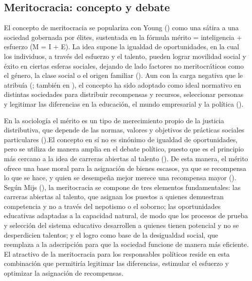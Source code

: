 \documentclass[
  spanish,
  a4paper,
  oneside]{scrbook}
\begin{document}
\subsection{Meritocracia: concepto y
debate}\label{meritocracia-concepto-y-debate}

El concepto de meritocracia se populariza con Young
() como una sátira a una sociedad
gobernada por élites, sustentada en la fórmula mérito = inteligencia +
esfuerzo (M = I + E). La idea supone la igualdad de oportunidades, en la
cual los individuos, a través del esfuerzo y el talento, pueden lograr
movilidad social y éxito en ciertas esferas sociales, dejando de lado
factores no meritocráticos como el género, la clase social o el origen
familiar ().
Aun con la carga negativa que le atribuía
(; también en
), el concepto ha sido adoptado
como ideal normativo en distintas sociedades para distribuir recompensas
y recursos, seleccionar personas y legitimar las diferencias en la
educación, el mundo empresarial y la política
().

En la sociología el mérito es un tipo de merecimiento propio de la
justicia distributiva, que depende de las normas, valores y objetivos de
prácticas sociales particulares ().El concepto en sí no es sinónimo de igualdad de oportunidades,
pero se utiliza de manera amplia en el debate político, puesto que es el
principio más cercano a la idea de carreras abiertas al talento
(). De esta manera, el
mérito ofrece una base moral para la asignación de bienes escasos, ya
que se recompensa lo que se hace, y quien se desempeña mejor merece una
recompensa mayor ().
Según Mijs (), la
meritocracia se compone de tres elementos fundamentales: las carreras
abiertas al talento, que asignan los puestos a quienes demuestran
competencia y no a través del nepotismo o el soborno; las oportunidades
educativas adaptadas a la capacidad natural, de modo que los procesos de
prueba y selección del sistema educativo desarrollen a quienes tienen
potencial y no se desperdicien talentos; y el logro como base de la
desigualdad social, que reemplaza a la adscripción para que la sociedad
funcione de manera más eficiente. El atractivo de la meritocracia para
los responsables políticos reside en esta combinación que permitiría
legitimar las diferencias, estimular el esfuerzo y optimizar la
asignación de recompensas.
\end{document}
